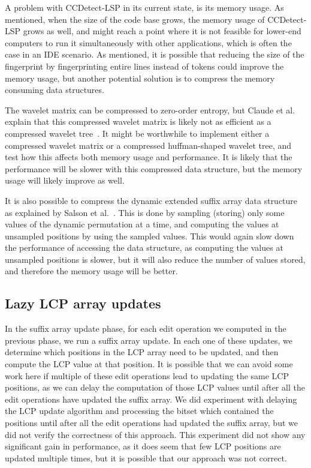 A problem with CCDetect-LSP in its current state, is its memory usage. As mentioned, when
the size of the code base grows, the memory usage of CCDetect-LSP grows as well, and might
reach a point where it is not feasible for lower-end computers to run it simultaneously
with other applications, which is often the case in an IDE scenario. As mentioned, it is
possible that reducing the size of the fingerprint by fingerprinting entire lines instead
of tokens could improve the memory usage, but another potential solution is to compress
the memory consuming data structures. 

The wavelet matrix can be compressed to zero-order entropy, but Claude et al. explain that
this compressed wavelet matrix is likely not as efficient as a compressed wavelet
tree~\cite{WaveletMatrix}. It might be worthwhile to implement either a compressed wavelet
matrix or a compressed huffman-shaped wavelet tree, and test how this affects both memory
usage and performance. It is likely that the performance will be slower with this
compressed data structure, but the memory usage will likely improve as well.

It is also possible to compress the dynamic extended suffix array data structure as
explained by Salson et al.~\cite{DynamicExtendedSuffixArrays}. This is done by sampling
(storing) only some values of the dynamic permutation at a time, and computing the values
at unsampled positions by using the sampled values. This would again slow down the
performance of accessing the data structure, as computing the values at unsampled
positions is slower, but it will also reduce the number of values stored, and therefore
the memory usage will be better.

\subsection*{Lazy LCP array updates}

In the suffix array update phase, for each edit operation we computed in the previous
phase, we run a suffix array update. In each one of these updates, we determine which
positions in the LCP array need to be updated, and then compute the LCP value at that
position. It is possible that we can avoid some work here if multiple of these edit
operations lead to updating the same LCP positions, as we can delay the computation of
those LCP values until after all the edit operations have updated the suffix array. We did
experiment with delaying the LCP update algorithm and processing the bitset which
contained the positions until after all the edit operations had updated the suffix array,
but we did not verify the correctness of this approach. This experiment did not show any
significant gain in performance, as it does seem that few LCP positions are updated
multiple times, but it is possible that our approach was not correct.

